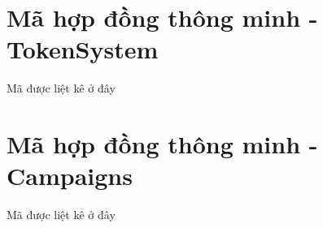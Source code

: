 \documentclass[a4paper,12pt,oneside]{report}
\theoremstyle{definition}
\begin{document}
\newpage
{}
\nocite{*} %
\pagestyle{plain}
\printbibliography %
\clearpage
\newpage
\appendix
\chapter{Mã hợp đồng thông minh - TokenSystem}
Mã được liệt kê ở đây

\chapter{Mã hợp đồng thông minh - Campaigns}
Mã được liệt kê ở đây
\end{document}
